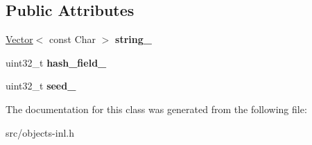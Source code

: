 \subsection*{Public Attributes}
\begin{DoxyCompactItemize}
\item 
\hypertarget{classv8_1_1internal_1_1_sequential_string_key_ad2ffeb3bb3a97b6b34cc541ca6cc4c60}{}\hyperlink{classv8_1_1internal_1_1_vector}{Vector}$<$ const Char $>$ {\bfseries string\+\_\+}\label{classv8_1_1internal_1_1_sequential_string_key_ad2ffeb3bb3a97b6b34cc541ca6cc4c60}

\item 
\hypertarget{classv8_1_1internal_1_1_sequential_string_key_a1654ac03f31e5d1a6615f85fb319ad43}{}uint32\+\_\+t {\bfseries hash\+\_\+field\+\_\+}\label{classv8_1_1internal_1_1_sequential_string_key_a1654ac03f31e5d1a6615f85fb319ad43}

\item 
\hypertarget{classv8_1_1internal_1_1_sequential_string_key_ad572724f69e1b6d99287969da2cc8ef2}{}uint32\+\_\+t {\bfseries seed\+\_\+}\label{classv8_1_1internal_1_1_sequential_string_key_ad572724f69e1b6d99287969da2cc8ef2}

\end{DoxyCompactItemize}


The documentation for this class was generated from the following file\+:\begin{DoxyCompactItemize}
\item 
src/objects-\/inl.\+h\end{DoxyCompactItemize}
